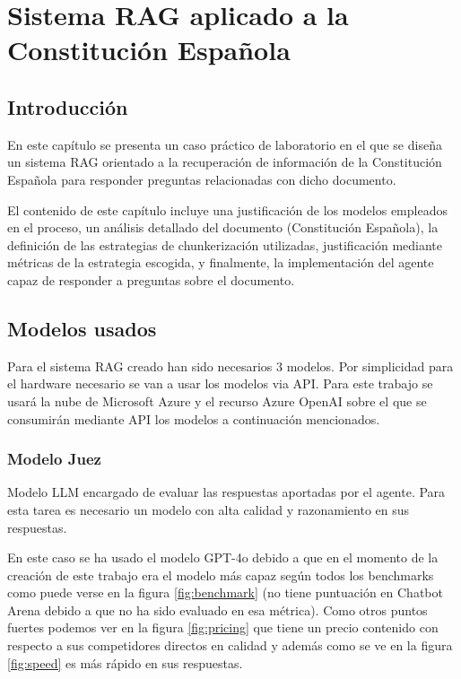 
\cleardoublepage

\chapter{Sistema RAG aplicado a la Constitución Española}

\section{Introducción}

En este capítulo se presenta un caso práctico de laboratorio en el que se diseña un sistema RAG orientado a la recuperación de información de la Constitución Española para responder preguntas relacionadas con dicho documento.

El contenido de este capítulo incluye una justificación de los modelos empleados en el proceso, un análisis detallado del documento (Constitución Española), la definición de las estrategias de chunkerización utilizadas, justificación mediante métricas de la estrategia escogida, y finalmente, la implementación del agente capaz de responder a preguntas sobre el documento.


\section{Modelos usados}

Para el sistema RAG creado han sido necesarios 3 modelos. Por simplicidad para el hardware necesario se van a usar los modelos via API. Para este trabajo se usará la nube de Microsoft Azure y el recurso Azure OpenAI sobre el que se consumirán mediante API los modelos a continuación mencionados.

\subsection{Modelo Juez}

Modelo LLM encargado de evaluar las respuestas aportadas por el agente. Para esta tarea es necesario un modelo con alta calidad y razonamiento en sus respuestas.

En este caso se ha usado el modelo GPT-4o debido a que en el momento de la creación de este trabajo era el modelo más capaz según todos los benchmarks como puede verse en la figura \ref{fig:benchmark} (no tiene puntuación en Chatbot Arena debido a que no ha sido evaluado en esa métrica). Como otros puntos fuertes podemos ver en la figura \ref{fig:pricing} que tiene un precio contenido con respecto a sus competidores directos en calidad y además como se ve en la figura \ref{fig:speed} es más rápido en sus respuestas.

